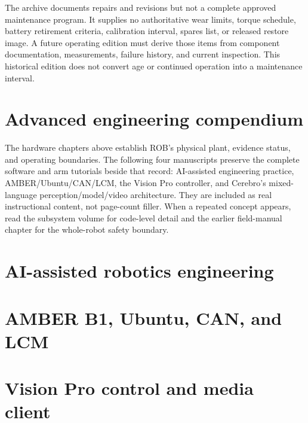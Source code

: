 \documentclass[10pt,openany]{book}
\begin{document}
\begin{fieldnotebox}[title={NO APPROVED MAINTENANCE SCHEDULE}]
The archive documents repairs and revisions but not a complete approved maintenance program. It supplies no authoritative wear limits, torque schedule, battery retirement criteria, calibration interval, spares list, or released restore image. A future operating edition must derive those items from component documentation, measurements, failure history, and current inspection. This historical edition does not convert age or continued operation into a maintenance interval.
\end{fieldnotebox}

\part{Advanced engineering compendium}
\setlength{\emergencystretch}{4em}
\sloppy

\begin{advancedbox}[title={WHY THE COMPLETE MANUAL INCLUDES THE FULL ADVANCED VOLUMES}]
The hardware chapters above establish ROB's physical plant, evidence status, and operating boundaries. The following four manuscripts preserve the complete software and arm tutorials beside that record: AI-assisted engineering practice, AMBER/Ubuntu/CAN/LCM, the Vision Pro controller, and Cerebro's mixed-language perception/model/video architecture. They are included as real instructional content, not page-count filler. When a repeated concept appears, read the subsystem volume for code-level detail and the earlier field-manual chapter for the whole-robot safety boundary.
\end{advancedbox}

\part{AI-assisted robotics engineering}

\part{AMBER B1, Ubuntu, CAN, and LCM}

\part{Vision Pro control and media client}
\end{document}
